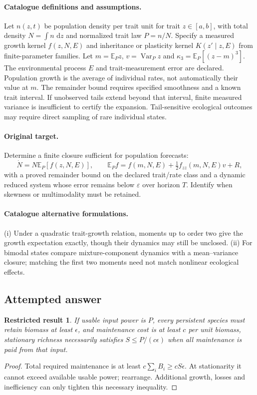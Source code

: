\documentclass[11pt]{article}
\newcommand{\E}{\mathbb E}
\DeclareMathOperator{\Var}{Var}
\newcommand{\dd}{\,\mathrm d}
\providecommand{\E}{\mathbb E}
\providecommand{\Var}{\operatorname{Var}}
\newtheorem{attemptresult}{Restricted result}[section]
\begin{document}
\paragraph{Catalogue definitions and assumptions.}
Let $n(z,t)$ be population density per trait unit for trait $z\in[a,b]$, with total density $N=\int n\,\dd z$ and normalized trait law $P=n/N$. Specify a measured growth kernel $f(z,N,E)$ and inheritance or plasticity kernel $K(z'\mid z,E)$ from finite-parameter families. Let $m=\E_Pz$, $v=\Var_Pz$ and $\kappa_3=\E_P[(z-m)^3]$. The environmental process $E$ and trait-measurement error are declared. Population growth is the average of individual rates, not automatically their value at $m$. The remainder bound requires specified smoothness and a known trait interval. If unobserved tails extend beyond that interval, finite measured variance is insufficient to certify the expansion. Tail-sensitive ecological outcomes may require direct sampling of rare individual states.
\paragraph{Original target.}
Determine a finite closure sufficient for population forecasts:
\[
 \dot N=N\E_P[f(z,N,E)],\qquad
 \E_Pf=f(m,N,E)+\tfrac12f_{zz}(m,N,E)v+R,
\]
with a proved remainder bound on the declared trait/rate class and a dynamic reduced system whose error remains below $\varepsilon$ over horizon $T$. Identify when skewness or multimodality must be retained.
\paragraph{Catalogue alternative formulations.}
(i) Under a quadratic trait-growth relation, moments up to order two give the growth expectation exactly, though their dynamics may still be unclosed. (ii) For bimodal states compare mixture-component dynamics with a mean--variance closure; matching the first two moments need not match nonlinear ecological effects.
\subsection{Attempted answer}
\begin{attemptresult}
If usable input power is $P$, every persistent species must retain biomass at least $\epsilon$, and maintenance cost is at least $c$ per unit biomass, stationary richness necessarily satisfies $S\leq P/(c\epsilon)$ when all maintenance is paid from that input.
\end{attemptresult}
\begin{proof}
Total required maintenance is at least $c\sum_iB_i\geq cS\epsilon$. At stationarity it cannot exceed available usable power; rearrange. Additional growth, losses and inefficiency can only tighten this necessary inequality.
\end{proof}
\end{document}
